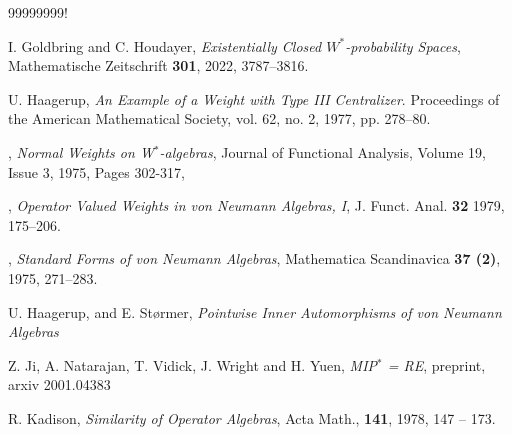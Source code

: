 \documentclass[12pt]{amsart}
\theoremstyle{definition}
\begin{document}
\begin{thebibliography}{99999999!}


 I. Goldbring and C. Houdayer, \emph{Existentially Closed $W^*$-probability Spaces}, Mathematische Zeitschrift \textbf{301}, 2022, 3787--3816.

 U. Haagerup, \emph{An Example of a Weight with Type III Centralizer}. Proceedings of the American Mathematical Society, vol. 62, no. 2, 1977, pp. 278–80.

 \bysame, \emph{Normal Weights on W$^*$-algebras}, Journal of Functional Analysis, Volume 19, Issue 3, 1975, Pages 302-317,

 \bysame, \emph{Operator Valued Weights in von Neumann Algebras, I}, J. Funct. Anal. {\bf 32} 1979, 175–206.

 \bysame, \emph{Standard Forms of von Neumann Algebras}, Mathematica Scandinavica {\bf 37 (2)}, 1975, 271--283.

 U. Haagerup, and E. St\o rmer, \emph{Pointwise Inner Automorphisms of von Neumann Algebras}

 Z. Ji, A. Natarajan, T. Vidick, J. Wright and H. Yuen, \emph{MIP$^*$ = RE}, preprint, arxiv 2001.04383



 R. Kadison, \emph{Similarity of Operator Algebras}, Acta Math., {\bf 141}, 1978, 147 -- 173.




\end{thebibliography}
\end{document}
